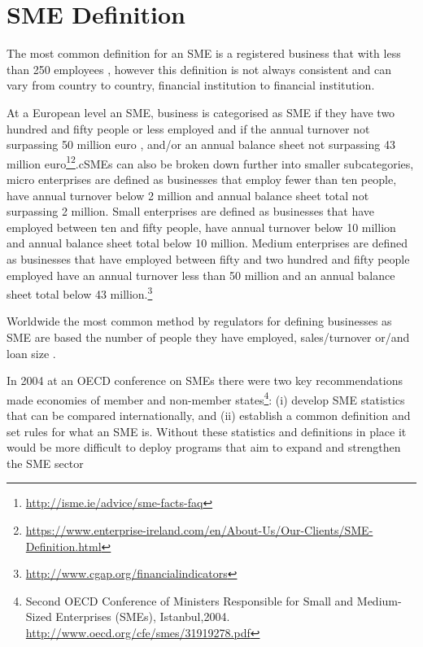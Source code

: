 \section{SME Definition}
The most common definition for an SME is a registered business that with less than 250 employees \citep{ifc_sme_2009}, however this definition is not always consistent and can vary from country to country, financial institution to financial institution. 

At a European level an SME, business is categorised as SME if they have two hundred and fifty people or less employed and if the annual turnover not surpassing 50 million euro , and/or an annual balance sheet not surpassing 43 million euro\footnote{\url{http://isme.ie/advice/sme-facts-faq}}\footnote{\url{https://www.enterprise-ireland.com/en/About-Us/Our-Clients/SME-Definition.html}}.cSMEs can also be broken down further into smaller subcategories, micro enterprises are defined as businesses that employ fewer than ten people, have annual turnover below 2 million and annual balance sheet total not surpassing 2 million. Small enterprises are defined as businesses that have employed between ten and fifty people, have annual turnover below 10 million and annual balance sheet total below 10 million. Medium enterprises are defined as businesses that have employed between fifty and two hundred and fifty people employed have an annual turnover less than 50 million and an annual balance sheet total below 43 million.\footnote{\url{http://www.cgap.org/financialindicators}}

Worldwide the most common method by regulators for defining businesses as SME are based the number of people they have employed, sales/turnover or/and loan size \cite{ardic_small_2011}.

In 2004 at an OECD conference on SMEs there were two key recommendations made economies of member and non-member states\footnote{Second OECD Conference of Ministers Responsible for Small and Medium-Sized Enterprises (SMEs), Istanbul,2004. \url{http://www.oecd.org/cfe/smes/31919278.pdf}}: (i) develop SME statistics that can be compared internationally, and (ii) establish a common definition and set rules for what an SME is. Without these statistics and definitions in place it would be more difficult to deploy programs that aim to expand and strengthen the SME sector\citep{ardic_small_2011}

